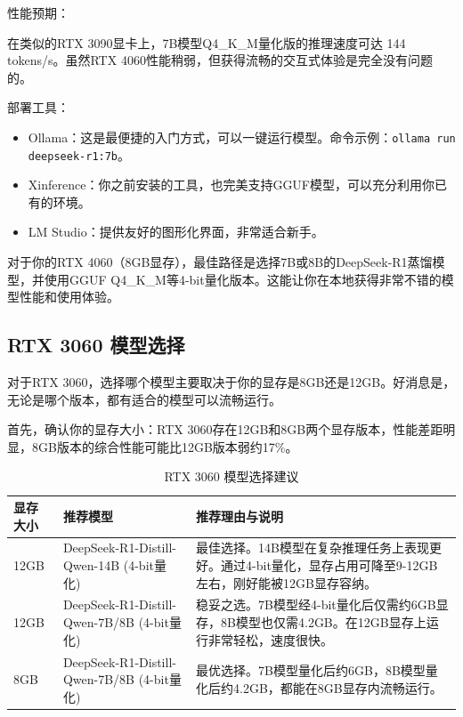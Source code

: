\documentclass[12pt,UTF8]{ctexbook}
\begin{document}
性能预期：

在类似的RTX 3090显卡上，7B模型Q4\_K\_M量化版的推理速度可达 144 tokens/s。虽然RTX 4060性能稍弱，但获得流畅的交互式体验是完全没有问题的。

部署工具：

\begin{itemize}[leftmargin=2cm]
    \item Ollama：这是最便捷的入门方式，可以一键运行模型。命令示例：\texttt{ollama run deepseek-r1:7b}。
    \item Xinference：你之前安装的工具，也完美支持GGUF模型，可以充分利用你已有的环境。
    \item LM Studio：提供友好的图形化界面，非常适合新手。
\end{itemize}

对于你的RTX 4060（8GB显存），最佳路径是选择7B或8B的DeepSeek-R1蒸馏模型，并使用GGUF Q4\_K\_M等4-bit量化版本。这能让你在本地获得非常不错的模型性能和使用体验。

\subsection{RTX 3060 模型选择}

对于RTX 3060，选择哪个模型主要取决于你的显存是8GB还是12GB。好消息是，无论是哪个版本，都有适合的模型可以流畅运行。

首先，确认你的显存大小：RTX 3060存在12GB和8GB两个显存版本，性能差距明显，8GB版本的综合性能可能比12GB版本弱约17\%。

\begin{table}[htbp]
    \centering
    \caption{RTX 3060 模型选择建议}
    \begin{tabular}{|p{1.5cm}|p{4cm}|p{5cm}|}
        \hline
        \textbf{显存大小} & \textbf{推荐模型} & \textbf{推荐理由与说明} \\
        \hline
        12GB & DeepSeek-R1-Distill-Qwen-14B (4-bit量化) & 最佳选择。14B模型在复杂推理任务上表现更好。通过4-bit量化，显存占用可降至9-12GB左右，刚好能被12GB显存容纳。 \\
        \hline
        12GB & DeepSeek-R1-Distill-Qwen-7B/8B (4-bit量化) & 稳妥之选。7B模型经4-bit量化后仅需约6GB显存，8B模型也仅需4.2GB。在12GB显存上运行非常轻松，速度很快。 \\
        \hline
        8GB & DeepSeek-R1-Distill-Qwen-7B/8B (4-bit量化) & 最优选择。7B模型量化后约6GB，8B模型量化后约4.2GB，都能在8GB显存内流畅运行。 \\
        \hline
    \end{tabular}
\end{table}
\end{document}
